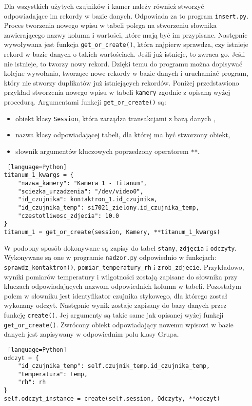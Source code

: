 \documentclass[a4paper,11pt,twoside]{article}
\begin{document}
Dla wszystkich użytych czujników i kamer należy również stworzyć odpowiadające im rekordy w bazie danych. Odpowiada za to program \texttt{insert.py}. Proces tworzenia nowego wpisu w tabeli polega na stworzeniu słownika zawierającego nazwy kolumn i wartości, które mają być im przypisane. Następnie wywoływana jest funkcja \texttt{get{\_}or{\_}create()}, która najpierw sprawdza, czy istnieje rekord w bazie danych o takich wartościach. Jeśli już istnieje, to zwraca go. Jeśli nie istnieje, to tworzy nowy rekord. Dzięki temu do programu można dopisywać kolejne wywołania, tworzące nowe rekordy w bazie danych i uruchamiać program, który nie stworzy duplikatów już istniejących rekordów. Poniżej przedstawiono przykład stworzenia nowego wpisu w tabeli \texttt{kamery} zgodnie z opisaną wyżej procedurą. Argumentami funkcji \texttt{get{\_}or{\_}create()} są:
\begin{itemize}
\item obiekt klasy \texttt{Session}, która zarządza transakcjami z bazą danych \cite{sqlalchemy-session},
\item nazwa klasy odpowiadającej tabeli, dla której ma być stworzony obiekt,
\item słownik argumentów kluczowych poprzedzony operatorem \texttt{**}.
\end{itemize}
\begin{lstlisting} [language=Python]
titanum_1_kwargs = {
    "nazwa_kamery": "Kamera 1 - Titanum",
    "sciezka_urzadzenia": "/dev/video0",
    "id_czujnika": kontaktron_1.id_czujnika,
    "id_czujnika_temp": si7021_zielony.id_czujnika_temp,
    "czestotliwosc_zdjecia": 10.0
}
titanum_1 = get_or_create(session, Kamery, **titanum_1_kwargs)
\end{lstlisting}

W podobny sposób dokonywane są zapisy do tabel \texttt{stany}, \texttt{zdjęcia} i \texttt{odczyty}. Wykonywane są one w programie \texttt{nadzor.py} odpowiednio w funkcjach: \linebreak\texttt{sprawdz{\_}kontaktron()}, \texttt{pomiar{\_}temperatury{\_}rh} i \texttt{zrob{\_}zdjecie}. Przykładowo, wyniki pomiarów temperatury i wilgotności zostają zapisane do słownika przy kluczach odpowiadających nazwom odpowiednich kolumn w tabeli. Pozostałym polem w słowniku jest identyfikator czujnika stykowego, dla którego został wykonany odczyt. Następnie wynik zostaje zapisany do bazy danych przez funkcję \texttt{create()}. Jej argumenty są takie same jak opisanej wyżej funkcji \texttt{get{\_}or{\_}create()}. Zwrócony obiekt odpowiadający nowemu wpisowi w bazie danych jest zapisywany w odpowiednim polu klasy Grupa.
\begin{lstlisting} [language=Python]
odczyt = {
	"id_czujnika_temp": self.czujnik_temp.id_czujnika_temp,
	"temperatura": temp,
	"rh": rh
}
self.odczyt_instance = create(self.session, Odczyty, **odczyt)
\end{lstlisting}
\end{document}
